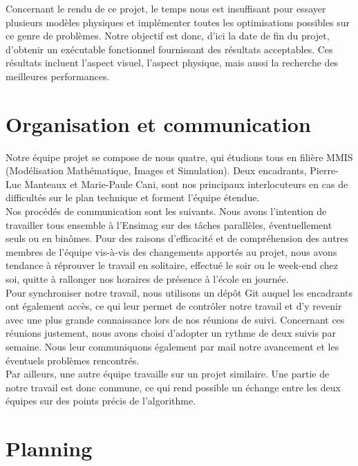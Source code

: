 \documentclass[a4paper,10pt]{article}
\begin{document}
Concernant le rendu de ce projet, le temps nous est insuffisant pour essayer plusieurs modèles physiques et implémenter toutes les optimisations possibles sur ce genre de problèmes. Notre objectif est donc, d'ici la date de fin du projet, d'obtenir un exécutable fonctionnel fournissant des résultats acceptables. Ces résultats incluent l'aspect visuel, l'aspect physique, mais aussi la recherche des meilleures performances.

\section{Organisation et communication}

Notre équipe projet se compose de nous quatre, qui étudions tous en filière MMIS (Modélisation Mathématique, Images et Simulation). Deux encadrants, Pierre-Luc Manteaux et Marie-Paule Cani, sont nos principaux interlocuteurs en cas de difficultés sur le plan technique et forment l'équipe étendue. \\

Nos procédés de communication sont les suivants. Nous avons l'intention de travailler tous ensemble à l'Ensimag sur des tâches parallèles, éventuellement seuls ou en binômes. Pour des raisons d'efficacité et de compréhension des autres membres de l'équipe vis-à-vis des changements apportés au projet, nous avons tendance à réprouver le travail en solitaire, effectué le soir ou le week-end chez soi, quitte à rallonger nos horaires de présence à l'école en journée. \\

Pour synchroniser notre travail, nous utilisons un dépôt Git auquel les encadrants ont également accès, ce qui leur permet de contrôler notre travail et d'y revenir avec une plus grande connaissance lors de nos réunions de suivi. Concernant ces réunions justement, nous avons choisi d'adopter un rythme de deux suivis par semaine. Nous leur communiquons également par mail notre avancement et les éventuels problèmes rencontrés. \\

Par ailleurs, une autre équipe travaille sur un projet similaire. Une partie de notre travail est donc commune, ce qui rend possible un échange entre les deux équipes sur des points précis de l'algorithme.

\section{Planning}
\end{document}
